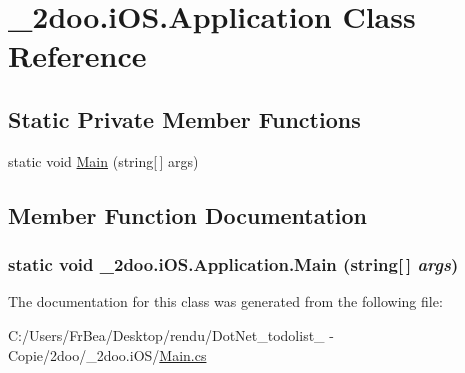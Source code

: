 \hypertarget{class__2doo_1_1i_o_s_1_1_application}{
\section{\_\-2doo.iOS.Application Class Reference}
\label{class__2doo_1_1i_o_s_1_1_application}
}
\subsection*{Static Private Member Functions}
\begin{CompactItemize}
\item 
static void \hyperlink{class__2doo_1_1i_o_s_1_1_application_98e5af03d82f8772b1cf9c7ef7afa13b}{Main} (string\mbox{[}$\,$\mbox{]} args)
\end{CompactItemize}


\subsection{Member Function Documentation}
\hypertarget{class__2doo_1_1i_o_s_1_1_application_98e5af03d82f8772b1cf9c7ef7afa13b}{
\subsubsection[{Main}]{\setlength{\rightskip}{0pt plus 5cm}static void \_\-2doo.iOS.Application.Main (string\mbox{[}$\,$\mbox{]} {\em args})}}
\label{class__2doo_1_1i_o_s_1_1_application_98e5af03d82f8772b1cf9c7ef7afa13b}




The documentation for this class was generated from the following file:\begin{CompactItemize}
\item 
C:/Users/FrBea/Desktop/rendu/DotNet\_\-todolist\_ - Copie/2doo/\_\-2doo.iOS/\hyperlink{_main_8cs}{Main.cs}\end{CompactItemize}
